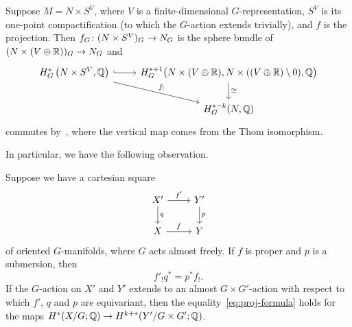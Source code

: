 \documentclass[AHL,Unicode,longabstracts]{cedram}
\makeatletter
\newcommand{\sm}{\ensuremath{\setminus}}
\newcommand{\cl}{\colon}
\newcommand{\dsm}{\oplus}
\newcommand{\bQ}{\mathbb{Q}}
\newcommand{\bR}{\mathbb{R}}
\renewcommand*{\to}{\mathchoice{\longrightarrow}{\rightarrow}{\rightarrow}{\rightarrow}}
\let\save@mathaccent\mathaccent
\newcommand*\if@single[3]{%
  \setbox0\hbox{${\mathaccent"0362{#1}}^H$}%
  \setbox2\hbox{${\mathaccent"0362{\kern0pt#1}}^H$}%
  \ifdim\ht0=\ht2 #3\else #2\fi
  }
\newcommand*\rel@kern[1]{\kern#1\dimexpr\macc@kerna}
\newcommand*\widebar[1]{\@ifnextchar^{{\wide@bar{#1}{0}}}{\wide@bar{#1}{1}}}
\newcommand*\wide@bar[2]{\if@single{#1}{\wide@bar@{#1}{#2}{1}}{\wide@bar@{#1}{#2}{2}}}
\newcommand*\wide@bar@[3]{%
  \begingroup
  \def\mathaccent##1##2{%
    \let\mathaccent\save@mathaccent
    \if#32 \let\macc@nucleus\first@char \fi
    \setbox\z@\hbox{$\macc@style{\macc@nucleus}_{}$}%
    \setbox\tw@\hbox{$\macc@style{\macc@nucleus}{}_{}$}%
    \dimen@\wd\tw@
    \advance\dimen@-\wd\z@
    \divide\dimen@ 3
    \@tempdima\wd\tw@
    \advance\@tempdima-\scriptspace
    \divide\@tempdima 10
    \advance\dimen@-\@tempdima
    \ifdim\dimen@>\z@ \dimen@0pt\fi
    \rel@kern{0.6}\kern-\dimen@
    \if#31
      \overline{\rel@kern{-0.6}\kern\dimen@\macc@nucleus\rel@kern{0.4}\kern\dimen@}%
      \advance\dimen@0.4\dimexpr\macc@kerna
      \let\final@kern#2%
      \ifdim\dimen@<\z@ \let\final@kern1\fi
      \if\final@kern1 \kern-\dimen@\fi
    \else
      \overline{\rel@kern{-0.6}\kern\dimen@#1}%
    \fi
  }%
  \macc@depth\@ne
  \let\math@bgroup\@empty \let\math@egroup\macc@set@skewchar
  \mathsurround\z@ \frozen@everymath{\mathgroup\macc@group\relax}%
  \macc@set@skewchar\relax
  \let\mathaccentV\macc@nested@a
  \if#31
    \macc@nested@a\relax111{#1}%
  \else
    \def\gobble@till@marker##1\endmarker{}%
    \futurelet\first@char\gobble@till@marker#1\endmarker
    \ifcat\noexpand\first@char A\else
      \def\first@char{}%
    \fi
    \macc@nested@a\relax111{\first@char}%
  \fi
  \endgroup
}
\let\oldbar\bar
\renewcommand*{\bar}[1]{{\mathchoice{\widebar{#1}}{\widebar{#1}}{\widebar{#1}}{\oldbar{#1}}}}
\makeatother
\begin{document}
\begin{exam}[Projection]\label{gysin-projection}
Suppose $M = N\times S^V$, where $V$ is a finite-dimensio\-nal $G$-representation, $S^V$ is its one-point compactification (to which the $G$-action extends trivially), and $f$ is the projection. Then $f_G \cl (N\times S^V)_G \to N_G$ is the sphere bundle of $(N\times (V\dsm \bR))_G \to N_G$ and
\[
\begin{tikzcd}
H^*_G\left(N\times S^V,\bQ\right)\arrow[r,hook,""] \arrow[dr,"f_!"]&H^{*+1}_G\bigl(N\times (V\oplus \bR),N\times ((V\oplus \bR)\sm 0),\bQ\bigr) \arrow[d,"\cong"]\\ &H^{*-k}_G(N,\bQ)
\end{tikzcd}
\]
commutes by~\cite[Section~3]{Du03}, where the vertical map comes from the Thom isomorphism.
\end{exam}



In particular, we have the following observation.




\begin{lemm}\label{projection-formula}
Suppose we have a cartesian square
\[
\begin{tikzcd}
X' \arrow[r,"f'"] \arrow[d,"q"]&Y'\arrow[d,"p"]\\ X \arrow[r,"f"] & Y
\end{tikzcd}
\]
of oriented $G$-manifolds, where $G$ acts almost freely. If $f$ is proper and $p$ is a submersion, then
\begin{equation}\label{eq:proj-formula}
f'_!q^* = p^*f_!.
\end{equation}
If the $G$-action on $X'$ and $Y'$ extends to an almost $G\times G'$-action with respect to which $f'$, $q$ and $p$ are equivariant, then the equality~\eqref{eq:proj-formula} holds for the maps $H^*(X/G;\bQ)\to H^{k+*}(Y'/G\times G';\bQ)$.
\end{lemm}
\end{document}
